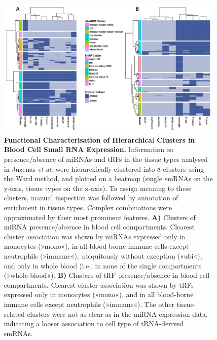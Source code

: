 \begin{figure}
\includegraphics[width=\textwidth]{figures/heatmaps-small}
\caption[Functional Characterisation of Hierarchical Clusters in Blood Cell Small RNA Expression.]{\textbf{Functional Characterisation of Hierarchical Clusters in Blood Cell Small RNA Expression.} Information on presence/absence of miRNAs and tRFs in the tissue types analysed in Juzenas \emph{et al.}\cite{Juzenas2017} were hierarchically clustered into 8 clusters using the Ward method,\cite{Ward1963} and plotted on a heatmap (single smRNAs on the y-axis, tissue types on the x-axis). To assign meaning to these clusters, manual inspection was followed by annotation of enrichment in tissue types. Complex combinations were approximated by their most prominent features. \textbf{A)} Clusters of miRNA presence/absence in blood cell compartments. Clearest cluster association was shown by miRNAs expressed only in monocytes (»mono«), in all blood-borne immune cells except neutrophils (»immune«), ubiquitously without exception (»ubi«), and only in whole blood (i.e., in none of the single compartments (»whole-blood«). \textbf{B)} Clusters of tRF presence/absence in blood cell compartments. Clearest cluster association was shown by tRFs expressed only in monocytes (»mono«), and in all blood-borne immune cells except neutrophils (»immune«). The other tissue-related clusters were not as clear as in the miRNA expression data, indicating a looser association to cell type of tRNA-derived smRNAs.
\label{fig:heatmaps-small}}
\end{figure}

